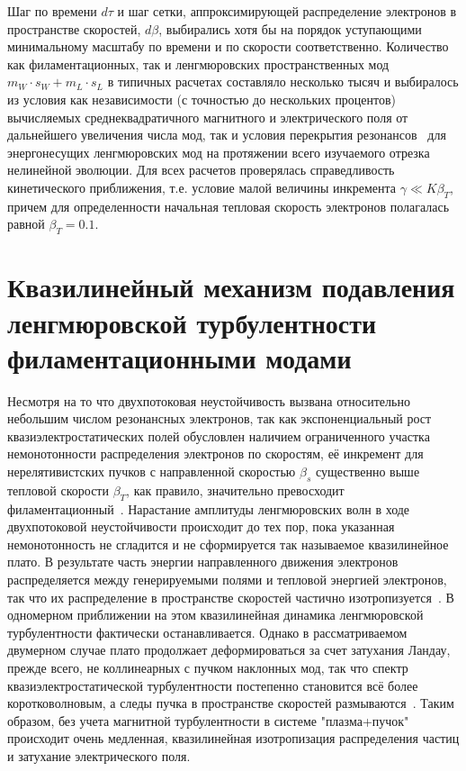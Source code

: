Шаг по времени $d\tau$ и шаг сетки, аппроксимирующей распределение электронов в пространстве скоростей, $d\beta$, выбирались хотя бы на порядок уступающими минимальному масштабу по времени и по скорости соответственно. Количество как филаментационных, так и ленгмюровских пространственных мод  $m_W\cdot s_W+m_L\cdot s_L$ в типичных расчетах составляло несколько тысяч  и выбиралось из условия как независимости (с точностью до нескольких процентов) вычисляемых среднеквадратичного магнитного и электрического поля от дальнейшего увеличения числа мод, так и условия перекрытия резонансов~\cite{GaleevSagdeev1969,Bakunin2017} для энергонесущих ленгмюровских мод на протяжении всего изучаемого отрезка нелинейной эволюции. Для всех расчетов проверялась справедливость кинетического приближения, т.е. условие малой величины инкремента $\gamma\ll K\beta_T$, причем для определенности начальная тепловая скорость электронов полагалась равной $\beta_{T}=0.1$. 

\section{Квазилинейный механизм подавления ленгмюровской турбулентности филаментационными модами}

Несмотря на то что двухпотоковая неустойчивость вызвана относительно небольшим числом резонансных электронов, так как экспоненциальный рост квазиэлектростатических полей обусловлен наличием ограниченного участка немонотонности распределения электронов по скоростям, её инкремент для нерелятивистских пучков с направленной скоростью $\beta_s$ существенно выше тепловой скорости $\beta_{T}$, как правило, значительно превосходит филаментационный~\cite{Bret2010}. Нарастание амплитуды ленгмюровских волн в ходе двухпотоковой неустойчивости происходит до тех пор, пока указанная немонотонность не сгладится и не сформируется так называемое квазилинейное плато.  В результате часть энергии направленного движения электронов распределяется между генерируемыми полями и тепловой энергией электронов, так что их распределение в пространстве скоростей частично изотропизуется~\cite{GaleevSagdeev1969}. В одномерном приближении на этом квазилинейная динамика ленгмюровской турбулентности фактически останавливается. Однако в рассматриваемом двумерном случае плато продолжает деформироваться за счет затухания Ландау, прежде всего, не коллинеарных с пучком наклонных мод, так что спектр квазиэлектростатической турбулентности постепенно становится всё более коротковолновым, а следы пучка в пространстве скоростей размываются~\cite{Appert1976,Yi2010}. Таким образом, без учета магнитной турбулентности в системе "плазма+пучок" происходит очень медленная, квазилинейная изотропизация распределения частиц и затухание электрического поля. 

